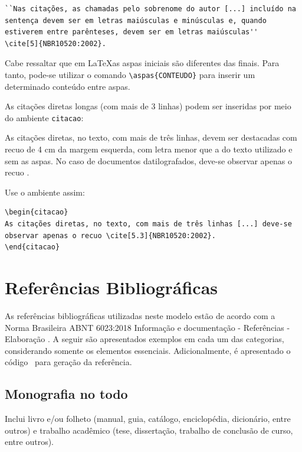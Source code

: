 \begin{verbatim}
``Nas citações, as chamadas pelo sobrenome do autor [...] incluído na 
sentença devem ser em letras maiúsculas e minúsculas e, quando 
estiverem entre parênteses, devem ser em letras maiúsculas''
\cite[5]{NBR10520:2002}.
\end{verbatim}

Cabe ressaltar que em \LaTeX as aspas iniciais são diferentes das finais. Para tanto, pode-se utilizar o comando \verb|\aspas{CONTEUDO}| para inserir um determinado conteúdo entre aspas.

As citações diretas longas (com mais de 3 linhas) podem ser inseridas por meio do ambiente \texttt{citacao}:

\begin{citacao}
As citações diretas, no texto, com mais de três linhas, devem ser
destacadas com recuo de 4 cm da margem esquerda, com letra menor que a do texto
utilizado e sem as aspas. No caso de documentos datilografados, deve-se
observar apenas o recuo \cite[5.3]{NBR10520:2002}.
\end{citacao}

Use o ambiente assim:

\begin{verbatim}
\begin{citacao}
As citações diretas, no texto, com mais de três linhas [...] deve-se 
observar apenas o recuo \cite[5.3]{NBR10520:2002}.
\end{citacao}
\end{verbatim}

\section{Referências Bibliográficas}

As referências bibliográficas utilizadas neste modelo estão de acordo com a Norma Brasileira ABNT 6023:2018 Informação e documentação - Referências - Elaboração \cite{abnt}. A seguir são apresentados exemplos em cada um das categorias, considerando somente os elementos essenciais. Adicionalmente, é apresentado o código \BibTeX~para geração da referência.

\subsection{Monografia no todo}\label{sec:monografia}

Inclui livro e/ou folheto (manual, guia, catálogo, enciclopédia, dicionário, entre outros) e trabalho acadêmico (tese, dissertação, trabalho de conclusão de curso, entre outros).

